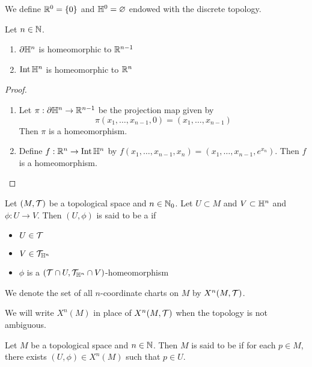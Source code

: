 \documentclass{book}
\begin{document}
	\begin{defn}
		We define $\mathbb{R}^0 = \{0\}$ and $\mathbb{H}^0 = \varnothing$ endowed with the discrete topology.
	\end{defn}
	
	\begin{ex} Let $n \in \mathbb{N}$.
	\begin{enumerate}
		\item $\partial \mathbb{H}^n$ is homeomorphic to $\mathbb{R}^{n-1}$
		\item $\operatorname{Int} \mathbb{H}^n$ is homeomorphic to $\mathbb{R}^n$
	\end{enumerate}  
	\end{ex}
	
	\begin{proof}\
	\begin{enumerate}
		\item Let $\pi: \partial \mathbb{H}^n \rightarrow \mathbb{R}^{n-1}$ be the projection map given by 
		$$\pi(x_1, \ldots, x_{n-1}, 0) = (x_1, \ldots, x_{n-1})$$ 
		Then $\pi$ is a homeomorphism.
		\item Define $f: \mathbb{R}^n \rightarrow \operatorname{Int} \mathbb{H}^n$ by $f(x_1, \ldots, x_{n-1}, x_n) = (x_1, \ldots, x_{n-1}, e^{x_n})$. Then $f$ is a homeomorphism.
	\end{enumerate}
	\end{proof}		
	
	\begin{defn}
		Let $(M, \mathcal{T})$ be a topological space and $n \in \mathbb{N}_0$. Let $U \subset M$ and $V \subset \mathbb{H}^n$ and $\phi:U \rightarrow V$. Then $(U, \phi)$ is said to be a  if 
		\begin{itemize}
			\item $U \in \mathcal{T}$ 
			\item $V \in \mathcal{T}_{\mathbb{H}^n}$
			\item $\phi$ is a $(\mathcal{T} \cap U, \mathcal{T}_{\mathbb{H}^n} \cap V)$-homeomorphism 
		\end{itemize}
	We denote the set of all $n$-coordinate charts on $M$ by $X^n(M, \mathcal{T})$.
	\end{defn}

	\begin{note}
		We will write $X^n(M)$ in place of $X^n(M, \mathcal{T})$ when the topology is not ambiguous.
	\end{note} 

	\begin{defn}
		Let $M$ be a topological space and $n \in \mathbb{N}$. Then $M$ is said to be  if for each $p \in M$, there exists $(U, \phi) \in X^n(M)$ such that $p \in U$. 
	\end{defn}
\end{document}
